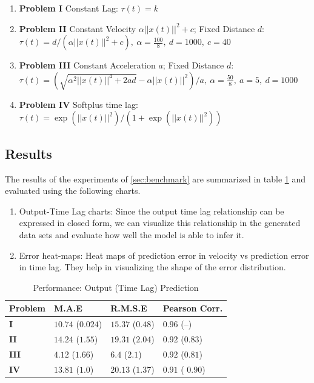 \documentclass[envcountsect,runningheads]{llncs}
\theoremstyle{etoile}
\begin{document}
\begin{enumerate}
\item \textbf{Problem I} Constant Lag: \newline 
$\tau(t) = k$

\item \textbf{Problem II} Constant Velocity $\alpha ||x(t)||^2 + c$; Fixed Distance $d$: 
\newline $\tau(t) = d/(\alpha ||x(t)||^2 + c),\ \alpha = \frac{100}{8},\ d = 1000,\ c = 40$

\item \textbf{Problem III} Constant Acceleration $a$; Fixed Distance $d$: 
\newline $\tau(t) = (\sqrt{\alpha^2||x(t)||^4 + 2ad} - \alpha||x(t)||^2)/a,\ \alpha = \frac{50}{8},\ a = 5,\ d = 1000$

\item \textbf{Problem IV} Softplus time lag: 
\newline $\tau(t) = \exp\left(||x(t)||^2\right)/\left(1 + \exp(||x(t)||^2)\right)$

\end{enumerate}



\subsection{Results}

The results of the experiments of \ref{sec:benchmark} are summarized in table \ref{tab:results_syn} 
and evaluated using the following charts.

\begin{enumerate}
    \item Output-Time Lag charts: Since the output time lag relationship can be expressed in closed 
          form, we can visualize this relationship in the generated data sets and evaluate how well 
          the model is able to infer it.
    \item Error heat-maps: Heat maps of prediction error in velocity vs prediction error 
          in time lag. They help in visualizing the shape of the error distribution.
\end{enumerate}

\begin{table}
  \caption{Performance: Output (Time Lag) Prediction}\label{tab:results_syn}
  \centering
  \begin{tabular}{ l l l l}
  \hline
  Problem &  M.A.E & R.M.S.E & Pearson Corr.\\
  \hline
  \textbf{I} & $10.74$ ($0.024$)  & $15.37$ ($0.48$) & $0.96$ (--)\\
  \textbf{II} & $14.24$ ($1.55$) & $19.31$ ($2.04$) & $0.92$ ($0.83$)\\
  \textbf{III} & $4.12$ ($1.66$) & $6.4$ ($2.1$) & $0.92$ ($0.81$)\\
  \textbf{IV} & $13.81$ ($1.0$) & $20.13$ ($1.37$) & $0.91$ ( $0.90$)\\
  \hline
  \end{tabular}
\end{table}
\end{document}
